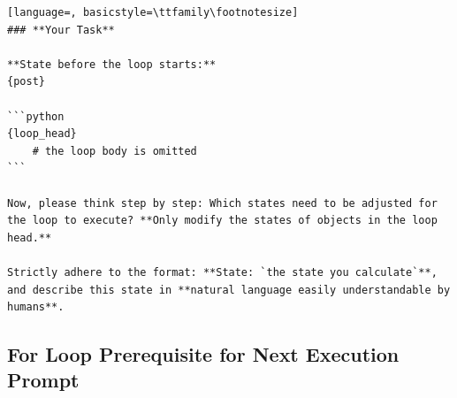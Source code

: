 \documentclass[sigconf]{acmart}
\begin{document}
\begin{tcolorbox}[ colback=gray!10, colframe=black, arc=5pt]
\begin{lstlisting}[language=, basicstyle=\ttfamily\footnotesize]
### **Your Task**

**State before the loop starts:**  
{post}

```python
{loop_head}
    # the loop body is omitted
```

Now, please think step by step: Which states need to be adjusted for the loop to execute? **Only modify the states of objects in the loop head.**

Strictly adhere to the format: **State: `the state you calculate`**, and describe this state in **natural language easily understandable by humans**.

\end{lstlisting}
\end{tcolorbox}

\subsection{For Loop Prerequisite for Next Execution Prompt}
\label{for_next_prompt}
\end{document}
